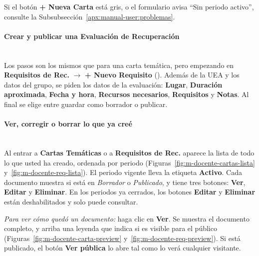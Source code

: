 Si el botón \textbf{+ Nueva Carta} está gris, o el formulario avisa ``Sin periodo activo'', consulte la Subsubsección~\ref{apx:manual-user:problemas}.

\paragraph{Crear y publicar una Evaluación de Recuperación}\label{apx:manual-user:profesor-requisito}\mbox{}\\
Los pasos son los mismos que para una carta temática, pero empezando en \textbf{Requisitos de Rec.} $\to$ \textbf{+ Nuevo Requisito} (). Además de la UEA y los datos del grupo, se piden los datos de la evaluación: \textbf{Lugar}, \textbf{Duración aproximada}, \textbf{Fecha y hora}, \textbf{Recursos necesarios}, \textbf{Requisitos} y \textbf{Notas}. Al final se elige entre guardar como borrador o publicar.

\paragraph{Ver, corregir o borrar lo que ya creé}\label{apx:manual-user:profesor-gestion}\mbox{}\\
Al entrar a \textbf{Cartas Temáticas} o a \textbf{Requisitos de Rec.} aparece la lista de todo lo que usted ha creado, ordenada por periodo (Figuras~\ref{fig:m-docente-cartas-lista} y~\ref{fig:m-docente-req-lista}). El periodo vigente lleva la etiqueta \textbf{Activo}. Cada documento muestra si está en \emph{Borrador} o \emph{Publicado}, y tiene tres botones: \textbf{Ver}, \textbf{Editar} y \textbf{Eliminar}. En los periodos ya cerrados, los botones \textbf{Editar} y \textbf{Eliminar} están deshabilitados y solo puede consultar.



\textit{Para ver cómo quedó un documento:} haga clic en \textbf{Ver}. Se muestra el documento completo, y arriba una leyenda que indica si es visible para el público (Figuras~\ref{fig:m-docente-carta-preview} y~\ref{fig:m-docente-req-preview}). Si está publicado, el botón \textbf{Ver pública} lo abre tal como lo verá cualquier visitante.


